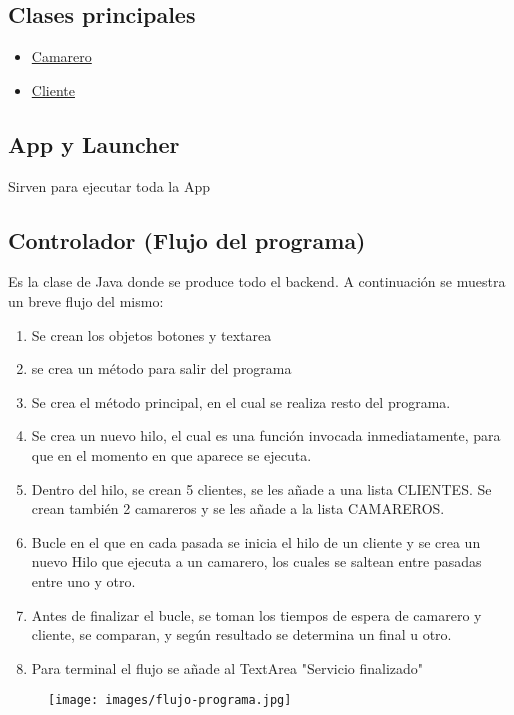 \documentclass[14pt]{extarticle}
\begin{document}
    \subsection{Clases principales}
        \begin{itemize}
            \item \underline{Camarero}
            \item \underline{Cliente}
        \end{itemize}

    \subsection{App y Launcher}
        Sirven para ejecutar toda la App

    \subsection{Controlador (Flujo del programa)}
        Es la clase de Java donde se produce todo el backend.
        A continuación se muestra un breve flujo del mismo:
        \begin{enumerate}
            \item Se crean los objetos botones y textarea
            \item se crea un método para salir del programa
            \item Se crea el método principal, en el cual se realiza resto del programa.
            \item Se crea un nuevo hilo, el cual es una función invocada inmediatamente, para que en el momento en que aparece se ejecuta.
            \item Dentro del hilo, se crean 5 clientes, se les añade a una lista CLIENTES. Se crean también 2 camareros y se les añade a la lista CAMAREROS.
            \item Bucle en el que en cada pasada se inicia el hilo de un cliente y se crea un nuevo Hilo que ejecuta a un camarero, los cuales se saltean entre pasadas entre uno y otro.
            \item Antes de finalizar el bucle, se toman los tiempos de espera de camarero y cliente, se comparan, y según resultado se determina un final u otro.
            \item Para terminal el flujo se añade al TextArea "Servicio finalizado"
        \end{enumerate}
        \begin{figure}[h!]
            \centering
            \texttt{[image: images/flujo-programa.jpg]}
        \end{figure}
\end{document}
